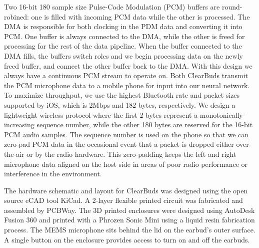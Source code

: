 \documentclass [11pt, proquest] {uwthesis}[2020/02/24]
\begin{document}
Two 16-bit 180 sample size Pulse-Code Modulation (PCM) buffers are round-robined: one is filled with incoming PCM data while the other is processed. The DMA is responsible for both clocking in the PDM data and converting it into PCM. One buffer is always connected to the DMA, while the other is freed for processing for the rest of the data pipeline. When the buffer connected to the DMA fills, the buffers switch roles and we begin processing data on the newly freed buffer, and connect the other buffer back to the DMA. With this design we always have a continuous PCM stream to operate on.
Both ClearBuds transmit the PCM microphone data to a mobile phone for input into our neural network. To maximize throughput, we use the highest Bluetooth rate and packet sizes supported by iOS, which is 2Mbps and 182 bytes, respectively. We design a lightweight wireless protocol where the first 2 bytes represent a monotonically-increasing sequence number, while the other 180 bytes are reserved for the 16-bit PCM audio samples. The sequence number is used on the  phone so that we can zero-pad PCM data in the occasional event that a packet is dropped either over-the-air or by the radio hardware. This zero-padding keeps the left and right microphone data aligned on the host side in areas of poor radio performance or interference in the environment.

The hardware schematic and layout for ClearBuds was designed using the open source eCAD tool KiCad. A 2-layer flexible printed circuit was  fabricated and assembled by PCBWay. The 3D printed enclosures were designed using AutoDesk Fusion 360 and printed with a Phrozen Sonic Mini   using  a liquid resin fabrication process.   The MEMS microphone sits behind the lid on the earbud's outer surface.
A single button on the enclosure  provides access to turn on and off the earbuds.

\end{document}
